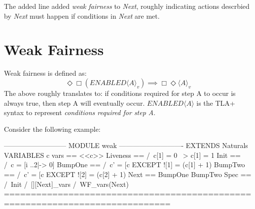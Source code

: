 \documentclass{report}
\begin{document}
The added line added \textit{weak fairness} to \textit{Next}, roughly indicating
actions descrbied by \textit{Next} must happen if conditions in \textit{Next}
are met. 

\section{Weak Fairness}

Weak fairness is defined as:\newline
\begin{equation} 
\Diamond\Box(ENABLED\langle A \rangle _v) \implies \Box\Diamond\langle A \rangle _v
\end{equation}
The above roughly translates to: if conditions required for step A to occur is
always true, then step A will eventually occur. $ENABLED\langle A \rangle$ is
the TLA+ syntax to represent \textit{conditions required for step A}.\newline

Consider the following example:
\begin{tla}
--------------------------- MODULE weak ----------------------------
EXTENDS Naturals
VARIABLES c
vars == <<c>>
Liveness == 
    /\ c[1] = 0 ~> c[1] = 1
Init ==
    /\ c = [i ..2|-> 0] 
BumpOne == 
    /\ c' = [c EXCEPT ![1] = (c[1] + 1) %
BumpTwo ==
    /\ c' = [c EXCEPT ![2] = (c[2] + 1) %
Next == 
    \/ BumpOne
    \/ BumpTwo
Spec ==
    /\ Init
    /\ [][Next]_vars
    /\ WF_vars(Next)
=============================================================================
\end{tla}
\begin{tlatex}
\@x{}\moduleLeftDash{}\moduleRightDash\@xx{}%
%
%
%
%
%
%
%
%
%
%
%
%
%
%
%
%
\@x{}\bottombar\@xx{}%
\end{tlatex}
\end{document}
